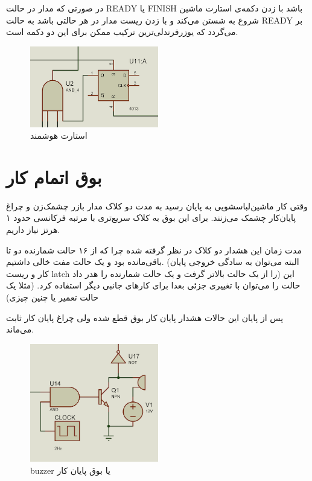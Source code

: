 در صورتی که مدار در حالت
READY
یا
FINISH
باشد با زدن دکمه‌ی استارت ماشین شروع به شستن می‌کند و با زدن ریست مدار در هر حالتی باشد به حالت
READY
بر می‌گردد که یوزرفرندلی‌ترین ترکیب ممکن برای این دو دکمه است.

\begin{figure}[h!]
    \centering
    \includegraphics[width=0.5\textwidth]{part1/5.png}
    \caption{
    استارت هوشمند
    }
    \label{fig:start}
\end{figure}

\section{
بوق اتمام کار
}
وقتی کار ماشین‌لباسشویی به پایان رسید به مدت دو کلاک مدار بازر چشمک‌زن و چراغ پایان‌کار چشمک می‌زنند.
برای این بوق به کلاک سریع‌تری با مرتبه فرکانسی حدود ۱ هرتز نیاز داریم.

مدت زمان این هشدار دو کلاک در نظر گرفته شده چرا که از ۱۶ حالت شمارنده دو تا باقی‌مانده بود و یک حالت مفت خالی داشتیم.
(البته می‌توان به سادگی خروجی پایان کار و ریست
latch
را از یک حالت بالاتر گرفت و یک حالت شمارنده را هدر داد)
این حالت را می‌توان با تغییری جزئی بعدا برای کارهای جانبی دیگر استفاده کرد.
(مثلا یک حالت تعمیر یا چنین چیزی)

پس از پایان این حالات هشدار پایان کار بوق قطع شده ولی چراغ پایان کار ثابت می‌ماند.

\begin{figure}[h!]
    \centering
    \includegraphics[width=0.5\textwidth]{part1/7.png}
    \caption{
    buzzer
    یا
    بوق پایان کار
    }
    \label{fig:buzzer}
\end{figure}

